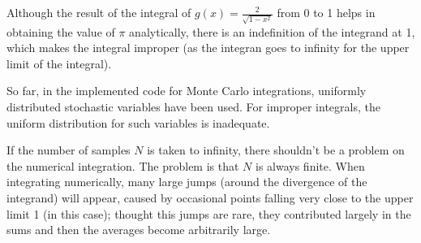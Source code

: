 \documentclass[paper=a4, fontsize=11pt]{scrartcl} %
\numberwithin{equation}{section} %
\numberwithin{figure}{section} %
\numberwithin{table}{section} %
\begin{document}
Although the result of the integral of $g(x) = \frac{2}{\sqrt{1-x^2}}$ from 0 to 1 helps in obtaining the value of $\pi$ analytically, there is an indefinition of the integrand at 1, which makes the integral improper (as the integran goes to infinity for the upper limit of the integral). 

So far, in the implemented code for Monte Carlo integrations, uniformly distributed stochastic variables have been used. For improper integrals, the uniform distribution for such variables is inadequate.

If the number of samples $N$ is taken to infinity, there shouldn't be a problem on the numerical integration. The problem is that $N$ is always finite. When integrating numerically, many large jumps (around the divergence of the integrand) will appear, caused by occasional points falling very close to the upper limit 1 (in this case); thought this jumps are rare, they contributed largely in the sums and then the averages become arbitrarily large.
\end{document}
